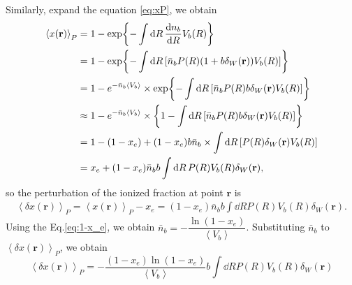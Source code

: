 	Similarly, expand the equation \eqref{eq:xP}, we obtain
	\begin{align}
		\left<
		x(\textbf{r})
		\right>_P
		&=
		1-\exp{
			-\int \dd{R}{
				\dfrac{
					\dd{n_b}}{\dd {R}
				}V_b(R)
			}
		}
		\notag\\
		&=
		1-\exp{
			-\int \dd{R}\left[
				\bar{n}_b P(R)(
				1+b\delta_W(\mathbf{r})
				)
				V_b(R)
			\right]
		}
		\notag\\
		&=
		1-e^{
			-\bar{n}_b\left<
				V_b
			\right>
			}\times\exp{
			-\int \dd{R}\left[
				\bar{n}_b P(R)b\delta_W(\mathbf{r})V_b(R)
			\right]
		}
		\notag\\
		&\approx
		1-e^{
			-\bar{n}_b\left<
				V_b
			\right>
		}\times\left\{
			1-\int \dd{R}\left[
				\bar{n}_b P(R)b\delta_W(\mathbf{r})V_b(R)
			\right]
		\right\}
		\notag\\
		&=
		1-(1-x_e)
		+(1-x_e) b \bar{n}_b
		\times\int \dd{R}\left[
				P(R)\delta_W(\mathbf{r})V_b(R)
			\right]
		\notag\\
		&=
		x_e + (1-x_e) \bar{n}_b b \int\dd{R}{P(R) V_b(R) \delta_W(\mathbf{r})},
	\end{align}
	so the perturbation of the ionized fraction at point $\mathbf{r}$ is
	\begin{align*}
		\left<
		\delta{x(\textbf{r})}
		\right>_P
		=
		\left<
		x(\textbf{r})
		\right>_P
		-x_e
		=(1-x_e) \bar{n}_b b \int\dd{R}{P(R) V_b(R) \delta_W(\mathbf{r})}.
	\end{align*}
	Using the Eq.\eqref{eq:1-x_e}, we obtain $\bar{n}_b = -\dfrac{\ln(1-x_e)} {\left<V_b\right>}$. Substituting $\bar{n}_b$ to $\left<\delta{x(\textbf{r})}\right>_P$,
	we obtain
	\begin{equation}
		\left<
		\delta{x(\textbf{r})}
		\right>_P
		=
		-\dfrac{
			(1-x_e)\ln(1-x_e)
			}{\left<
				V_b
			\right>} b \int\dd{R}{
				P(R) V_b(R) \delta_W(\mathbf{r})
			}
		\label{eq:delta_x}
	\end{equation}

	